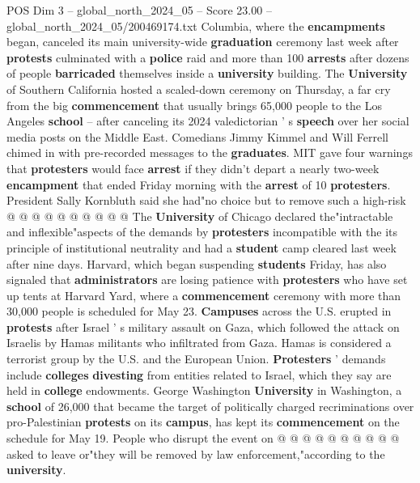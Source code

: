 \begin{textsample}{POS Dim 3 – global\_north\_2024\_05 – Score 23.00 – global\_north\_2024\_05/200469174.txt}
Columbia, where the \textbf{encampments} began, canceled its main university-wide \textbf{graduation} ceremony last week after \textbf{protests} culminated with a \textbf{police} raid and more than 100 \textbf{arrests} after dozens of people \textbf{barricaded} themselves inside a \textbf{university} building.
The \textbf{University} of Southern California hosted a scaled-down ceremony on Thursday, a far cry from the big \textbf{commencement} that usually brings 65,000 people to the Los Angeles \textbf{school} -- after canceling its 2024 valedictorian ' s \textbf{speech} over her social media posts on the Middle East.
Comedians Jimmy Kimmel and Will Ferrell chimed in with pre-recorded messages to the \textbf{graduates}.
MIT gave four warnings that \textbf{protesters} would face \textbf{arrest} if they didn't depart a nearly two-week \textbf{encampment} that ended Friday morning with the \textbf{arrest} of 10 \textbf{protesters}.
President Sally Kornbluth said she had"no choice but to remove such a high-risk @ @ @ @ @ @ @ @ @ @ The \textbf{University} of Chicago declared the"intractable and inflexible"aspects of the demands by \textbf{protesters} incompatible with the its principle of institutional neutrality and had a \textbf{student} camp cleared last week after nine days.
Harvard, which began suspending \textbf{students} Friday, has also signaled that \textbf{administrators} are losing patience with \textbf{protesters} who have set up tents at Harvard Yard, where a \textbf{commencement} ceremony with more than 30,000 people is scheduled for May 23. \textbf{Campuses} across the U.S. erupted in \textbf{protests} after Israel ' s military assault on Gaza, which followed the attack on Israelis by Hamas militants who infiltrated from Gaza.
Hamas is considered a terrorist group by the U.S. and the European Union. \textbf{Protesters} ' demands include \textbf{colleges} \textbf{divesting} from entities related to Israel, which they say are held in \textbf{college} endowments.
George Washington \textbf{University} in Washington, a \textbf{school} of 26,000 that became the target of politically charged recriminations over pro-Palestinian \textbf{protests} on its \textbf{campus}, has kept its \textbf{commencement} on the schedule for May 19.
People who disrupt the event on @ @ @ @ @ @ @ @ @ @ asked to leave or"they will be removed by law enforcement,"according to the \textbf{university}.

\end{textsample}
